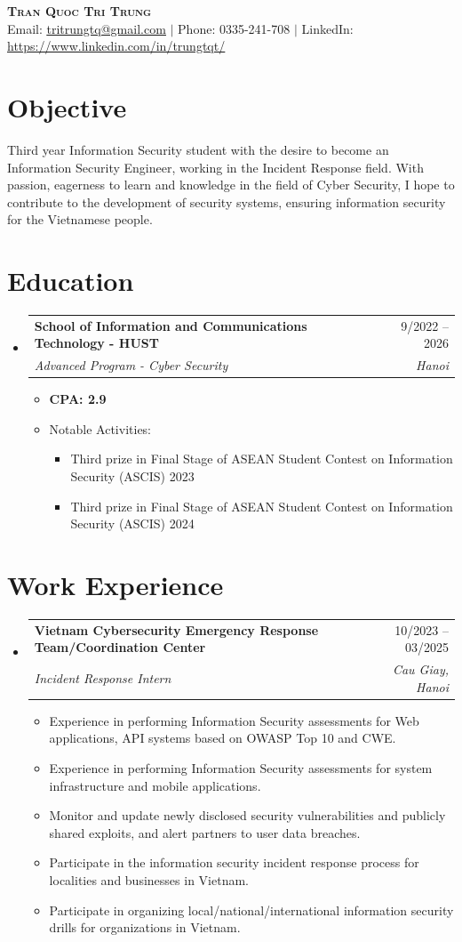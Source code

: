 \documentclass[letterpaper,10pt]{article}
\makeatletter
\newcommand{\link}[2]{\href{#1}{\color{blue}\underline{#2}}}
\newcommand{\resumeItem}[1]{
  \item\small{
    {#1 \vspace{-2pt}}
  }
}
\newcommand{\resumeSubheading}[4]{
  \vspace{-2pt}\item
  \begin{tabular*}{0.97\textwidth}[t]{l@{\extracolsep{\fill}}r}
    \textbf{#1} & #2 \\
    \textit{\small#3} & \textit{\small #4} \\
  \end{tabular*}\vspace{-7pt}
}
\newcommand{\resumeSubHeadingListStart}{\begin{itemize}[leftmargin=0.15in, label={}]}
\newcommand{\resumeSubHeadingListEnd}{\end{itemize}}
\newcommand{\resumeItemListStart}{\begin{itemize}}
\newcommand{\resumeItemSubListStart}{\begin{itemize}\setlength\itemsep{0.4em}}
\newcommand{\resumeItemListEnd}{\end{itemize}\vspace{-5pt}}
\newcommand{\resumeItemSubListEnd}{\end{itemize}}
\makeatother
\begin{document}
\begin{center}
	\textbf{\huge \scshape Tran Quoc Tri Trung} \\ \vspace{3pt}
	\small Email: \link{mailto:tritrungtq@gmail.com}{tritrungtq@gmail.com} $|$
	Phone: 0335-241-708 $|$
	LinkedIn: \link{https://www.linkedin.com/in/trungtqt/}{https://www.linkedin.com/in/trungtqt/}

\end{center}

\section{Objective}
Third year Information Security student with the desire to become an Information Security Engineer, working in the Incident Response field. With passion, eagerness to learn and knowledge in the field of Cyber Security, I hope to contribute to the development of security systems, ensuring information security for the Vietnamese people.

\section{Education}
\resumeSubHeadingListStart
\resumeSubheading
{School of Information and Communications Technology - HUST}{9/2022 -- 2026}
{Advanced Program - Cyber Security}{Hanoi}

\resumeItemListStart
\resumeItem{\textbf{CPA: 2.9}}

\resumeItem{Notable Activities:}

\resumeItemSubListStart
\resumeItem{Third prize in Final Stage of ASEAN Student Contest on Information Security (ASCIS) 2023 }
\resumeItem{Third prize in Final Stage of ASEAN Student Contest on Information Security (ASCIS) 2024 }
\resumeItemSubListEnd
\resumeItemListEnd \resumeSubHeadingListEnd

\section{Work Experience} \resumeSubHeadingListStart

\resumeSubheading {Vietnam Cybersecurity Emergency Response Team/Coordination Center}{10/2023 -- 03/2025}
{Incident Response Intern}{Cau Giay, Hanoi}
\vspace{0.5pt}
\resumeItemListStart
\resumeItem{Experience in performing Information Security assessments for Web applications, API systems based on OWASP Top 10 and CWE.}
\resumeItem{Experience in performing Information Security assessments for system infrastructure and mobile applications.}
\resumeItem{Monitor and update newly disclosed security vulnerabilities and publicly shared exploits, and alert partners to user data breaches.}
\resumeItem{Participate in the information security incident response process for localities and businesses in Vietnam.}
\resumeItem{Participate in organizing local/national/international information security drills for organizations in Vietnam.}
\resumeItemListEnd
\resumeSubHeadingListEnd
\end{document}
